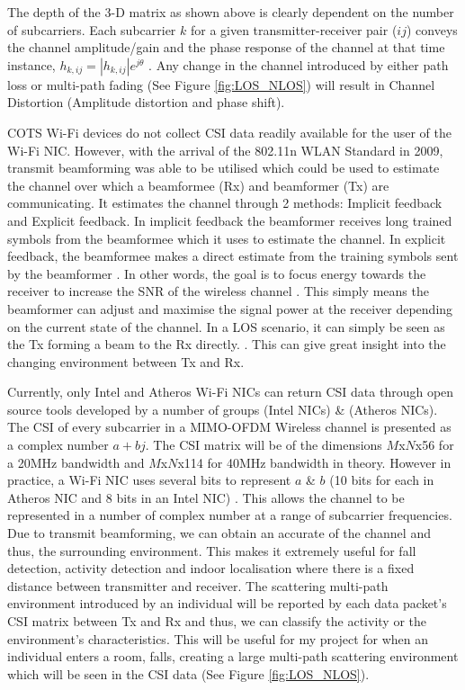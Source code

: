 The depth of the 3-D matrix as shown above is clearly dependent on the number of subcarriers. Each subcarrier $k$ for a given transmitter-receiver pair ($ij$) conveys the channel amplitude/gain and the phase response of the channel at that time instance, $h_{k,ij} = |h_{k,ij}|e^{j\theta}$ \citep{OFDM}. Any change in the channel introduced by either path loss or multi-path fading (See Figure \ref{fig:LOS_NLOS}) will result in Channel Distortion (Amplitude distortion and phase shift).\par 
COTS Wi-Fi devices do not collect CSI data readily available for the user of the Wi-Fi NIC. However, with the arrival of the 802.11n WLAN Standard in 2009, transmit beamforming was able to be utilised which could be used to estimate the channel over which a beamformee (Rx) and beamformer (Tx) are communicating. It estimates the channel through 2 methods: Implicit feedback and Explicit feedback. In implicit feedback the beamformer receives long trained symbols from the beamformee which it uses to estimate the channel. In explicit feedback, the beamformee makes a direct estimate from the training symbols sent by the beamformer \citep{full802.11nStandard}. In other words, the goal is to focus energy towards the receiver to increase the SNR of the wireless channel \citep{beamforming}. This simply means the beamformer can adjust and maximise the signal power at the receiver depending on the current state of the channel. In a LOS scenario, it can simply be seen as the Tx forming a beam to the Rx directly. \citep{beamforming}. This can give great insight into the changing environment between Tx and Rx. \par
Currently, only Intel and Atheros Wi-Fi NICs can return CSI data through open source tools developed by a number of groups \citep{Halperin_csitool} (Intel NICs) \& \citep{Xie:2015:PPD:2789168.2790124} (Atheros NICs). The CSI of every subcarrier in a MIMO-OFDM Wireless channel is presented as a complex number $a+bj$. The CSI matrix will be of the dimensions $M$x$N$x56 for a 20MHz bandwidth and $M$x$N$x114 for 40MHz bandwidth in theory. However in practice, a Wi-Fi NIC uses several bits to represent $a$ \& $b$ (10 bits for each in Atheros NIC and 8 bits in an Intel NIC) \citep{Xie:2015:PPD:2789168.2790124}. This allows the channel to be represented in a number of complex number at a range of subcarrier frequencies. Due to transmit beamforming, we can obtain an accurate of the channel and thus, the surrounding environment. This makes it extremely useful for fall detection, activity detection and indoor localisation where there is a fixed distance between transmitter and receiver. The scattering multi-path environment introduced by an individual will be reported by each data packet's CSI matrix between Tx and Rx and thus, we can classify the activity or the environment's characteristics. This will be useful for my project for when an individual enters a room, falls, creating a large multi-path scattering environment which will be seen in the CSI data (See Figure \ref{fig:LOS_NLOS}).


